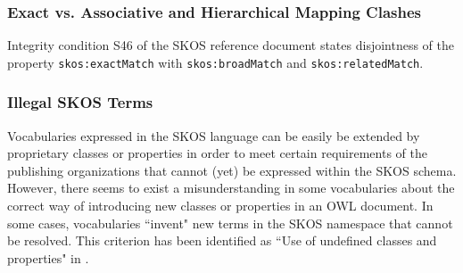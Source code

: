 
\subsubsection{Exact vs. Associative and Hierarchical Mapping Clashes} Integrity condition S46 of the SKOS reference document states disjointness of the property \texttt{skos:exactMatch} with \texttt{skos:broadMatch} and \texttt{skos:relatedMatch}.


\subsubsection{Illegal SKOS Terms} Vocabularies expressed in the SKOS language can be easily be extended by proprietary classes or properties in order to meet certain requirements of the publishing organizations that cannot (yet) be expressed within the SKOS schema. However, there seems to exist a misunderstanding in some vocabularies about the correct way of introducing new classes or properties in an OWL document. In some cases, vocabularies ``invent" new terms in the SKOS namespace that cannot be resolved. This criterion has been identified as ``Use of undefined classes and properties" in \cite{Hogan2010}.

